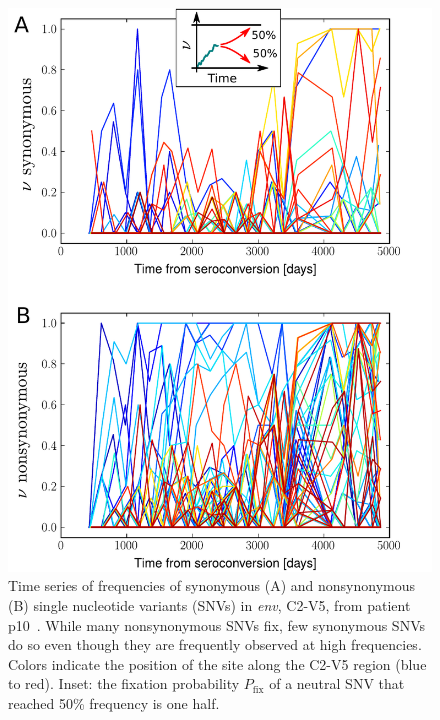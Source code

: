 \documentclass[11pt]{article}
\newcommand{\pfix}{P_{\mathrm{fix}}}
\newcommand{\env}{\textit{env}}
\newcommand{\shankaregion}{C2-V5}
\begin{document}




\begin{figure}
\begin{center}
\includegraphics[width=0.6\linewidth]{fig1}
\caption{Time series of frequencies
of synonymous (A) and nonsynonymous (B) single nucleotide variants (SNVs) in \env, 
\shankaregion, from patient p10~\cite{shankarappa_consistent_1999}.
While many nonsynonymous SNVs fix, few synonymous
SNVs do so even though they are frequently observed at high
frequencies. Colors indicate the position of the site along the \shankaregion{} region
(blue to red). Inset: the fixation probability $\pfix$ of a neutral
SNV that reached 50\% frequency is one half.}
\label{fig:aft}
\end{center}
\end{figure}
\end{document}
